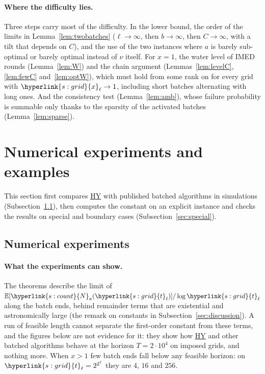 \documentclass[10pt]{article}
\newcommand{\sy}[2]{{\hyperlink{#1}{#2}}}
\newcommand{\E}{\mathbb{E}}
\newcommand{\1}{\mathbf{1}}
\newcommand{\Ng}{\sy{s:count}{N}}
\newcommand{\tl}{\sy{s:grid}{t}}
\newcommand{\xg}{\sy{s:grid}{x}}
\newcommand{\HY}{\hyperref[def:hy]{\textup{HY}}}
\begin{document}
\paragraph{Where the difficulty lies.} Three steps carry most of the difficulty. In the lower bound, the order of the limits in Lemma~\ref{lem:twobatches} ($\ell\to\infty$,
then $b\to\infty$, then $C\to\infty$, with a tilt that depends on $C$), and the use of the two instances where $a$ is barely sub-optimal or barely optimal instead of
$\nu$ itself. For $x=1$, the water level of IMED rounds (Lemma~\ref{lem:W}) and the chain argument (Lemmas~\ref{lem:levelC}, \ref{lem:fewC} and~\ref{lem:optW}), which must
hold from some rank on for every grid with $\xg_\ell\to1$, including short batches alternating with long ones. And the consistency test (Lemma~\ref{lem:amb}), whose
failure probability is summable only thanks to the sparsity of the activated batches (Lemma~\ref{lem:sparse}).

\section{Numerical experiments and examples}\label{sec:examples}\label{sec:sanity}

This section first compares \HY{} with published batched algorithms in simulations (Subsection~\ref{sec:experiments}), then computes the
constant on an explicit instance and checks the results on special and boundary cases (Subsection~\ref{sec:special}).

\subsection{Numerical experiments}\label{sec:experiments}

\paragraph{What the experiments can show.} The theorems describe the limit of $\E[\Ng_a(\tl_\ell)]/\log\tl_\ell$ along the batch ends, behind remainder
terms that are existential and astronomically large (the remark on constants in Subsection~\ref{sec:discussion}). A run of feasible length cannot
separate the first-order constant from these terms, and the figures below are not evidence for it: they show how \HY{} and other batched algorithms
behave at the horizon $T=2\cdot10^4$ on imposed grids, and nothing more. When $x>1$ few batch ends fall below any feasible horizon: on
$\tl_\ell=2^{2^\ell}$ they are $4$, $16$ and $256$.
\end{document}

